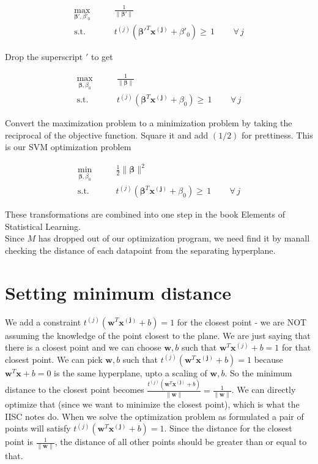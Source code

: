 \documentclass{article}
\newcommand{\beq}{\begin{equation}}
\newcommand{\eeq}{\end{equation}}
\begin{document}
\beq
\label{eqn:formulation5}
\begin{aligned}
  \max_{\pmb{\beta}',\beta'_0} &  \qquad \frac{1}{\|\pmb{\beta}'\|} \\
  \textrm{s.t.} & \qquad {t^{(j)}({\pmb{\beta}'}^T{\pmb{x^{(j)}}} + \beta'_0)} \ge\, 1  \, \qquad \forall \,{j}
\end{aligned}
\eeq

Drop the superscript $'$ to get 

\beq
\label{eqn:formulation6}
\begin{aligned}
  \max_{\pmb{\beta},\beta_0} &  \qquad \frac{1}{\|\pmb{\beta}\|} \\
  \textrm{s.t.} & \qquad {t^{(j)}({\pmb{\beta}}^T{\pmb{x^{(j)}}} + \beta_0)} \ge \, 1  \, \qquad \forall \,{j}
\end{aligned}
\eeq

Convert the maximization problem to a minimization problem by taking the reciprocal of the objective function. Square it and add $(1/2)$ for prettiness. This is our SVM optimization problem

\beq
\label{eqn:formulation7}
\begin{aligned}
  \min_{\pmb{\beta},\beta_0} &  \qquad \frac{1}{2}{\|\pmb{\beta}\|^2} \\
  \textrm{s.t.} & \qquad {t^{(j)}({\pmb{\beta}}^T{\pmb{x^{(j)}}} + \beta_0)} \ge \, 1  \, \qquad \forall \,{j}
\end{aligned}
\eeq

These transformations are combined into one step in the book Elements of Statistical Learning. \\

Since $M$ has dropped out of our optimization program, we need find it by manall checking the distance of each datapoint from the separating hyperplane.


\section{Setting minimum distance}

We add a constraint $t^{(j)}(\pmb{w}^T\pmb{x^{(j)}}+b)=1$ for the closest point - we are NOT assuming the knowledge of the point closest to the plane. We are just saying that there is a closest point and we can choose $\pmb{w},b$ such that $\pmb{w}^T\pmb{x}^{(j)}+b=1$ for that closest point. We can pick $\pmb{w},b$ such that $t^{(j)}(\pmb{w}^T\pmb{x^{(j)}}+b)=1$ because $\pmb{w}^T\pmb{x}+b=0$ is the same hyperplane, upto a scaling of $\pmb{w},b$. So the minimum distance to the closest point becomes $\frac{t^{(j)}(\pmb{w}^T\pmb{x^{(j)}}+b)}{\|\pmb{w}\|}=\frac{1}{\|\pmb{w}\|}$. We can directly optimize that (since we want to minimize the closest point), which is what the IISC notes do. When we solve the optimization problem as formulated a pair of points will satisfy $t^{(j)}(\pmb{w}^T\pmb{x^{(j)}}+b)=1$. Since the distance for the closest point is $\frac{1}{\|\pmb{w}\|}$, the distance of all other points should be greater than or equal to that.\\
\end{document}
